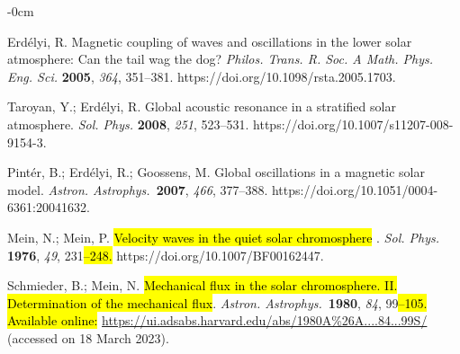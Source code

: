 \documentclass[physics,article,accept,pdftex,moreauthors]{Definitions/mdpi}
\newcommand{\aap}{{\it Astron. Astrophys.}}
\begin{document}
\begin{adjustwidth}{-\extralength}{0cm}
	
	
	
	
	\begin{thebibliography}{999}
		
		 Erd\'elyi, R. Magnetic coupling of waves and oscillations in the lower solar atmosphere: 
Can 
the tail wag the dog? \emph{Philos. Trans. R. Soc. A Math. Phys. Eng. Sci.} \textbf{2005}, \emph{364}, 351--381. https://doi.org/10.1098/rsta.2005.1703.
		
		 Taroyan, Y.; Erd\'elyi, R. Global acoustic resonance in a stratified 
solar atmosphere. \emph{Sol. Phys.} \textbf{2008}, \emph{251}, 523--531. https://doi.org/10.1007/s11207-008-9154-3.
		
		 Pint\'er, B.; Erd\'elyi, R.; Goossens, M. Global oscillations in a magnetic 
solar model. \aap~\textbf{2007}, \emph{466}, 377--388. https://doi.org/10.1051/0004-6361:20041632.
		
		Mein, N.; Mein, P.  \hl{Velocity waves in the quiet solar chromosphere}%
		. \emph{Sol. Phys.} \textbf{1976}, \emph{49}, 231\hl{--248.} https://doi.org/10.1007/BF00162447.
		
		 Schmieder, B.; Mein, N. \hl{Mechanical flux in the solar chromosphere. II. 
Determination of the mechanical flux}. \aap~\textbf{1980}, \emph{84}, 99\hl{--105.}
\hl{Available online:} \url{https://ui.adsabs.harvard.edu/abs/1980A%26A....84...99S/} (accessed on 18 March 2023).
		

\end{thebibliography}
\end{adjustwidth}
\end{document}
